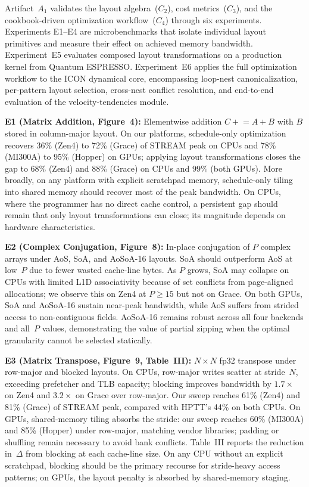 \documentclass[conference]{IEEEtran}
\begin{document}
\newartifact

\artrel

Artifact~$A_1$ validates the layout algebra~($C_2$), cost metrics~($C_3$), and the cookbook-driven optimization workflow~($C_4$) through six experiments.
Experiments E1--E4 are microbenchmarks that isolate individual layout primitives and measure their effect on achieved memory bandwidth.
Experiment~E5 evaluates composed layout transformations on a production kernel from Quantum ESPRESSO.
Experiment~E6 applies the full optimization workflow to the ICON dynamical core, encompassing loop-nest canonicalization, per-pattern layout selection, cross-nest conflict resolution, and end-to-end evaluation of the velocity-tendencies module.

\artexp

\textbf{E1 (Matrix Addition, Figure~4):}
Elementwise addition $C \mathrel{+}= A + B$ with $B$ stored in column-major layout.
On our platforms, schedule-only optimization recovers 36\% (Zen4) to 72\% (Grace) of STREAM peak on CPUs and 78\% (MI300A) to 95\% (Hopper) on GPUs; applying layout transformations closes the gap to 68\% (Zen4) and 88\% (Grace) on CPUs and 99\% (both GPUs).
More broadly, on any platform with explicit scratchpad memory, schedule-only tiling into shared memory should recover most of the peak bandwidth.
On CPUs, where the programmer has no direct cache control, a persistent gap should remain that only layout transformations can close; its magnitude depends on hardware characteristics.

\textbf{E2 (Complex Conjugation, Figure~8):}
In-place conjugation of $P$ complex arrays under AoS, SoA, and AoSoA-16 layouts.
SoA should outperform AoS at low~$P$ due to fewer wasted cache-line bytes.
As $P$ grows, SoA may collapse on CPUs with limited L1D associativity because of set conflicts from page-aligned allocations; we observe this on Zen4 at $P \geq 15$ but not on Grace.
On both GPUs, SoA and AoSoA-16 sustain near-peak bandwidth, while AoS suffers from strided access to non-contiguous fields.
AoSoA-16 remains robust across all four backends and all~$P$ values, demonstrating the value of partial zipping when the optimal granularity cannot be selected statically.

\textbf{E3 (Matrix Transpose, Figure~9, Table~III):}
$N \times N$ fp32 transpose under row-major and blocked layouts.
On CPUs, row-major writes scatter at stride~$N$, exceeding prefetcher and TLB capacity; blocking improves bandwidth by $1.7\times$ on Zen4 and $3.2\times$ on Grace over row-major.
Our sweep reaches 61\% (Zen4) and 81\% (Grace) of STREAM peak, compared with HPTT's 44\% on both CPUs.
On GPUs, shared-memory tiling absorbs the stride: our sweep reaches 60\% (MI300A) and 85\% (Hopper) under row-major, matching vendor libraries; padding or shuffling remain necessary to avoid bank conflicts.
Table~III reports the reduction in~$\Delta$ from blocking at each cache-line size.
On any CPU without an explicit scratchpad, blocking should be the primary recourse for stride-heavy access patterns; on GPUs, the layout penalty is absorbed by shared-memory staging.
\end{document}

